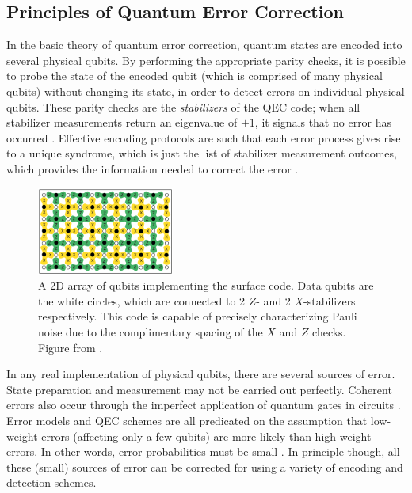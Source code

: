 \subsection{Principles of Quantum Error Correction}
In the basic theory of quantum error correction, quantum states are encoded into
several physical qubits. By performing the appropriate parity checks, it is
possible to probe the state of the encoded qubit (which is comprised of many
physical qubits) without changing its state, in order to detect errors on
individual physical qubits. These parity checks are the \textit{stabilizers} of
the QEC code; when all stabilizer measurements return an eigenvalue
of $+1$, it signals that no error has occurred \cite{nielsen_chuang_2010}.
Effective encoding protocols are such that each error process gives rise to a
unique syndrome, which is just the list of stabilizer measurement outcomes,
which provides the information needed to correct the error \cite{fowler12_surfac_codes}.

\begin{figure}
  \centering
  \includegraphics[width=0.4\textwidth]{images/surface_code.png}
  \caption{A 2D array of qubits implementing the surface code. Data qubits are
    the white circles, which are connected to 2 $Z$- and 2 $X$-stabilizers
    respectively. This code is capable of precisely characterizing Pauli noise
    due to the complimentary spacing of the $X$ and $Z$ checks. Figure from
    \cite{fowler12_surfac_codes}.}
  \label{fig:surface_code}
\end{figure}

In any real implementation of physical qubits, there are several sources of
error. State preparation and measurement may not be carried out perfectly.
Coherent errors also occur through the imperfect application of quantum gates in
circuits \cite{Devitt_2013}. Error models and QEC schemes are all
predicated on the assumption that low-weight errors (affecting only a few
qubits) are more likely than high weight errors. In other words, error
probabilities must be small \cite{terhal15}. In principle though, all these
(small) sources of error can be corrected for using a variety of encoding and
detection schemes.


